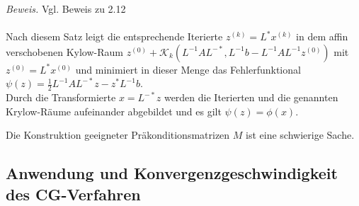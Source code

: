 \documentclass{article}
\begin{document}
    \textit{Beweis.} Vgl. Beweis zu 2.12 \\ \\
    Nach diesem Satz leigt die entsprechende Iterierte $z^{(k)}=L^*x^{(k)}$ in dem affin verschobenen Kylow-Raum
    $z^{(0)} + \mathcal{K}_k(L^{-1}AL^{-*}, L^{-1}b-L^{-1}AL^{-1}z^{(0)})$ mit $z^{(0)} = L^*x^{(0)}$ 
    und minimiert in dieser Menge das Fehlerfunktional $\psi(z) = \tfrac{1}{2}L^{-1}AL^{-*}z-z^*L^{-1}b$.  \\
    Durch die Transformierte $x=L^{-*}z$ werden die Iterierten und die genannten Krylow-Räume aufeinander abgebildet
    und es gilt $\psi(z) = \phi(x)$.
    \begin{rembox}
        Die Konstruktion geeigneter Präkonditionsmatrizen $M$ ist eine schwierige Sache.
    \end{rembox}
    \subsection{Anwendung und Konvergenzgeschwindigkeit des CG-Verfahren}
\end{document}
